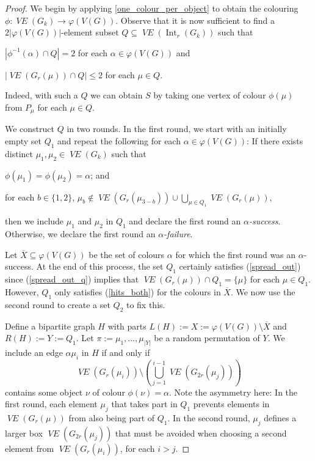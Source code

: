 \documentclass{patmorin}
\DeclareMathOperator{\interior}{Int}
\newcommand{\defin}[1]{\emph{\color{brightmaroon}#1}}
\DeclareMathOperator{\VE}{\mathit{VE}}
\begin{document}
\begin{proof}
  We begin by applying \cref{one_colour_per_object} to obtain the colouring $\phi:\VE(G_k)\to\varphi(V(G))$.  Observe that it is now sufficient to find a $2|\varphi(V(G))|$-element subset $Q\subseteq\VE(\interior_r(G_k))$ such that
  \begin{compactenum}[(i)]
    \item $|\phi^{-1}(\alpha)\cap Q|= 2$ for each $\alpha\in\varphi(V(G))$ and
    \item $|\VE(G_r(\mu))\cap Q|\le 2$ for each $\mu\in Q$.
  \end{compactenum}
  Indeed, with such a $Q$ we can obtain $S$ by taking one vertex of colour $\phi(\mu)$ from $P_\mu$ for each $\mu\in Q$.

  We construct $Q$ in two rounds.  In the first round, we start with an initially empty set $Q_1$ and repeat the following for each $\alpha\in\varphi(V(G))$:
  If there exists distinct $\mu_1,\mu_2\in\VE(G_k)$ such that
  \begin{compactenum}[(a)]
    \item $\phi(\mu_1)=\phi(\mu_2)=\alpha$; and\label{hits_both_q}
    \item for each $b\in\{1,2\}$, $\mu_b\not\in \VE(G_r(\mu_{3-b})) \cup \bigcup_{\mu\in Q_1} \VE(G_r(\mu))$,\label{spread_out_q}
  \end{compactenum}
  then we include $\mu_1$ and $\mu_2$ in $Q_1$ and declare the first round an \defin{$\alpha$-success}.  Otherwise, we declare the first round an \defin{$\alpha$-failure}.

  Let $\overline{X}\subseteq\varphi(V(G))$ be the set of colours $\alpha$ for which the first round was an $\alpha$-success. At the end of this process, the set $Q_1$ certainly satisfies (\ref{spread_out}) since (\ref{spread_out_q}) implies that $\VE(G_r(\mu))\cap Q_1=\{\mu\}$ for each $\mu\in Q_1$.  However, $Q_1$ only satisfies (\ref{hits_both}) for the colours in $\overline{X}$.  We now use the second round to create a set $Q_2$ to fix this.

  Define a bipartite graph $H$ with parts $L(H):=X:=\varphi(V(G))\setminus \overline{X}$ and $R(H):=Y:=Q_1$.  Let $\pi:=\mu_1,\ldots,\mu_{|Y|}$ be a random permutation of $Y$.  We include an edge $\alpha\mu_i$ in $H$ if and only if
  \[
    \VE(G_r(\mu_i))\setminus\left(\bigcup_{j=1}^{i-1}\VE(G_{2r}(\mu_j))\right)
  \]
  contains some object $\nu$ of colour $\phi(\nu)=\alpha$.  Note the asymmetry here: In the first round, each element $\mu_j$ that takes part in $Q_1$ prevents elements in $\VE(G_r(\mu))$ from also being part of $Q_1$.  In the second round, $\mu_j$ defines a larger box $\VE(G_{2r}(\mu_j))$ that must be avoided when choosing a second element from $\VE(G_r(\mu_i))$, for each $i>j$.


\end{proof}
\end{document}
